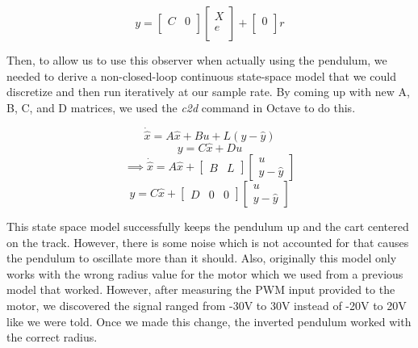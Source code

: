 \documentclass{article}
\begin{document}
\begin{equation}
\label{ss4}
y = 
\begin{bmatrix}
C&0\\
\end{bmatrix}
\begin{bmatrix}
X\\
e\\
\end{bmatrix} +
\begin{bmatrix}
0\\
\end{bmatrix} r
\end{equation}

Then, to allow us to use this observer when actually using the pendulum, we needed to derive a non-closed-loop continuous state-space model that we could discretize and then run iteratively at our sample rate. By coming up with new A, B, C, and D matrices, we used the \textit{c2d} command in Octave to do this.

\begin{equation*}
\dot{\hat{x}} = A \hat{x} + B u + L(y - \hat{y})
\end{equation*}
\begin{equation*}
y = C \hat{x} + D u
\end{equation*}
\begin{equation*}
\implies \dot{\hat{x}} = A \hat{x} + \begin{bmatrix}
B & L
\end{bmatrix} \begin{bmatrix}
u \\
y - \hat{y}
\end{bmatrix}
\end{equation*}
\begin{equation*}
y = C \hat{x} + \begin{bmatrix}
D & 0 & 0
\end{bmatrix} \begin{bmatrix}
u \\
y - \hat{y}
\end{bmatrix}
\end{equation*}

This state space model successfully keeps the pendulum up and the cart centered on the track. However, there is some noise which is not accounted for that causes the pendulum to oscillate more than it should. Also, originally this model only works with the wrong radius value for the motor which we used from a previous model that worked. However, after measuring the PWM input provided to the motor, we discovered the signal ranged from -30V to 30V instead of -20V to 20V like we were told. Once we made this change, the inverted pendulum worked with the correct radius.
\end{document}
